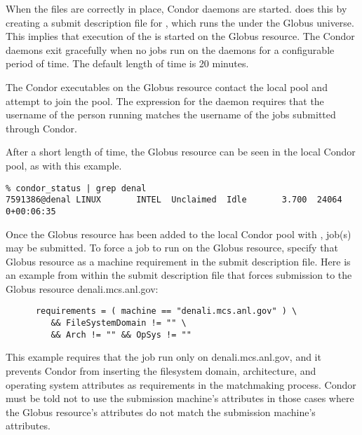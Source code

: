 When the files are correctly in place,
Condor daemons are started.
 does this by creating a submit description file for
, which runs the  under the Globus
universe.
This implies that execution of the  is started on the Globus
resource.
The Condor daemons exit gracefully when no jobs run on the daemons for a
configurable period of time. The default length of time is 20 minutes.

The Condor executables on the Globus resource contact the local pool and
attempt to join the pool.  The 
expression for the  daemon requires that the username
of the person running  matches the username of the jobs
submitted through Condor.

After a short length of time,
the Globus resource can be seen in the local Condor pool,
as with this example.

\begin{verbatim}
% condor_status | grep denal
7591386@denal LINUX       INTEL  Unclaimed  Idle       3.700  24064  0+00:06:35
\end{verbatim}

Once the Globus resource has been added to the local Condor
pool with ,
job(s) may be submitted.
To force a job to run on the Globus resource,
specify that Globus resource as a machine requirement
in the submit description file. 
Here is an example from within the submit description file
that forces submission to the Globus resource denali.mcs.anl.gov:
\begin{verbatim}
      requirements = ( machine == "denali.mcs.anl.gov" ) \
         && FileSystemDomain != "" \
         && Arch != "" && OpSys != ""
\end{verbatim}
This example requires that the job run only on denali.mcs.anl.gov,
and it prevents Condor from inserting the filesystem domain,
architecture, and operating system attributes as requirements
in the matchmaking process.
Condor must be told not to use the submission machine's
attributes in those cases
where the Globus resource's attributes
do not match the submission machine's attributes.
